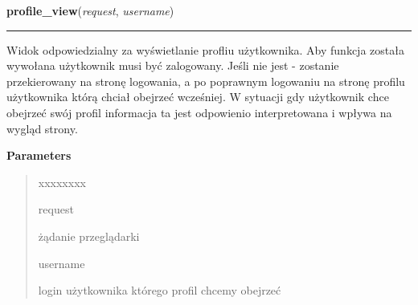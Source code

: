\hspace{.8\funcindent}\begin{boxedminipage}{\funcwidth}

    \raggedright \textbf{profile\_view}(\textit{request}, \textit{username})

    \vspace{-1.5ex}

    \rule{\textwidth}{0.5\fboxrule}
\setlength{\parskip}{2ex}
    Widok odpowiedzialny za wyświetlanie profliu użytkownika. Aby funkcja 
    została wywołana użytkownik musi być zalogowany. Jeśli nie jest - 
    zostanie przekierowany na stronę logowania, a po poprawnym logowaniu na
    stronę profilu użytkownika którą chciał obejrzeć wcześniej. W sytuacji 
    gdy użytkownik chce obejrzeć swój profil informacja ta jest odpowienio 
    interpretowana i wpływa na wygląd strony.

\setlength{\parskip}{1ex}
      \textbf{Parameters}
      \vspace{-1ex}

      \begin{quote}
        \begin{Ventry}{xxxxxxxx}

          \item[request]

          żądanie przeglądarki

          \item[username]

          login użytkownika którego profil chcemy obejrzeć

        \end{Ventry}

      \end{quote}

    \end{boxedminipage}

    \label{ass8_portal:accounts:views:latest_users}

    \vspace{0.5ex}

